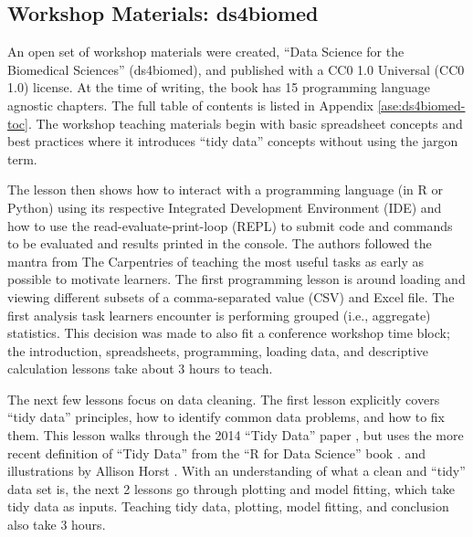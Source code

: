 \documentclass[030-workshop.tex]{subfiles}
\begin{document}
    \subsection{Workshop Materials: ds4biomed}

        An open set of workshop materials were created, ``Data Science for the Biomedical Sciences'' (ds4biomed),
        and published with a CC0 1.0 Universal (CC0 1.0) license. %
        At the time of writing, the book has 15 programming language agnostic chapters.
        The full table of contents is listed in Appendix \ref{ase:ds4biomed-toc}.
        The workshop teaching materials begin with basic spreadsheet concepts and
        best practices where it introduces ``tidy data'' concepts
        without using the jargon term.

        The lesson then shows how to interact with a programming language (in R or Python) using
        its respective Integrated Development Environment (IDE) and
        how to use the read-evaluate-print-loop (REPL)
        to submit code and commands to be evaluated and results printed in the console.
        The authors followed the mantra from The Carpentries of teaching the most useful tasks as early as possible
        to motivate learners.
        The first programming lesson is around loading and viewing different subsets of a
        comma-separated value (CSV) and Excel file.
        The first analysis task learners encounter is performing grouped (i.e., aggregate) statistics.
        This decision was made to also fit a conference workshop time block;
        the introduction, spreadsheets, programming, loading data, and descriptive calculation lessons
        take about 3 hours to teach.

        The next few lessons focus on data cleaning.
        The first lesson explicitly covers ``tidy data'' principles,
        how to identify common data problems,
        and how to fix them.
        This lesson walks through the 2014 ``Tidy Data'' paper
        \cite{wickhamTidyData2014},
        but uses the more recent definition of ``Tidy Data'' from the ``R for Data Science'' book
        \cite{wickhamR4ds}.
        and illustrations by Allison Horst
        \cite{horstGitHubStatsIllustrations}. %
        With an understanding of what a clean and ``tidy'' data set is,
        the next 2 lessons go through plotting and model fitting,
        which take tidy data as inputs.
        Teaching tidy data, plotting, model fitting, and conclusion also take 3 hours.
\end{document}

